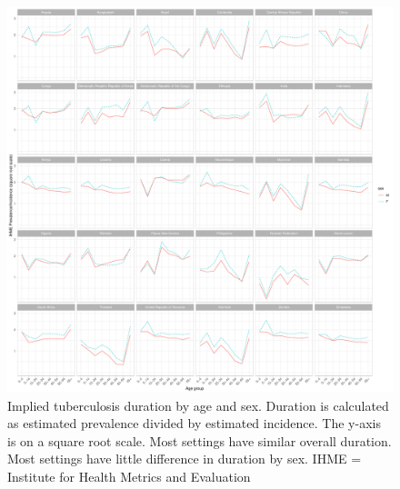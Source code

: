 \documentclass[12pt]{article}
\begin{document}
\begin{figure}
\centering
\includegraphics[width=1\textwidth]{../plots/aF5.pdf}
\caption[Implied duration by age and sex]{Implied tuberculosis duration by age and sex.
  Duration is calculated as estimated prevalence divided by estimated incidence.
The y-axis is on a square root scale. Most settings have similar overall
duration. Most settings have little difference in duration by sex. IHME = Institute for Health Metrics
and Evaluation}
\end{figure}

\FloatBarrier
\end{document}
